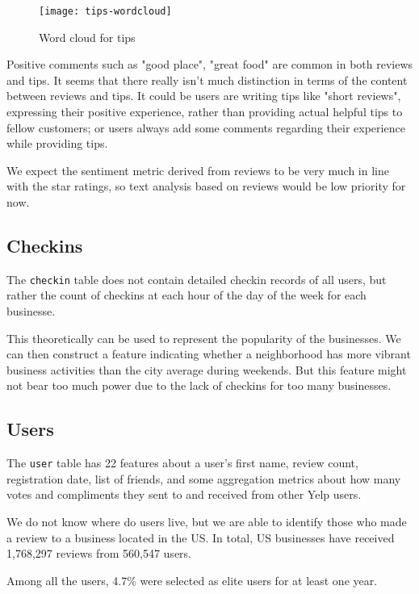 \documentclass[draftclsnofoot]{IEEEtran}
\let\MYoriglatexcaption\caption
\renewcommand{\caption}[2][\relax]{\MYoriglatexcaption[#2]{#2}}
\begin{document}
\begin{figure}[h]
\hspace{-.5em}
\texttt{[image: tips-wordcloud]}
\caption{Word cloud for tips}
\label{tips-wordcloud}
\end{figure}

Positive comments such as "good place", "great food" are common in both reviews and tips. It seems that there really isn't much distinction in terms of the content between reviews and tips. It could be users are writing tips like "short reviews", expressing their positive experience, rather than providing actual helpful tips to fellow customers; or users always add some comments regarding their experience while providing tips.

We expect the sentiment metric derived from reviews to be very much in line with the star ratings, so text analysis based on reviews would be low priority for now.

\subsection{Checkins}

The \texttt{checkin} table does not contain detailed checkin records of all users, but rather the count of checkins at each hour of the day of the week for each businesse.

This theoretically can be used to represent the popularity of the businesses. We can then construct a feature indicating whether a neighborhood has more vibrant business activities than the city average during weekends. But this feature might not bear too much power due to the lack of checkins for too many businesses.

\subsection{Users}

The \texttt{user} table has 22 features about a user's first name, review count, registration date, list of friends, and some aggregation metrics about how many votes and compliments they sent to and received from other Yelp users.

We do not know where do users live, but we are able to identify those who made a review to a business located in the US. In total, US businesses have received 1,768,297 reviews from 560,547 users.

Among all the users, 4.7\% were selected as elite users for at least one year.
\end{document}
